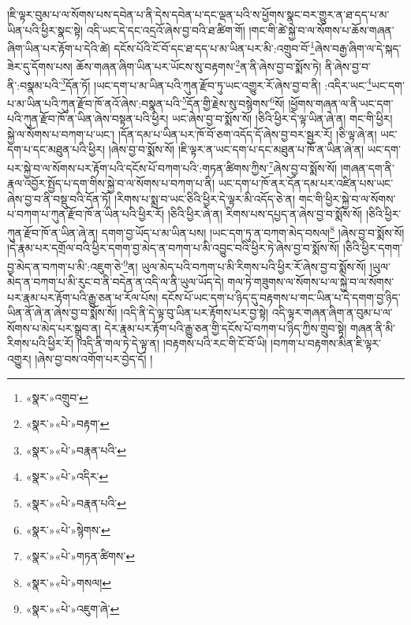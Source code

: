 །ཇི་ལྟར་བུམ་པ་ལ་སོགས་པས་དབེན་པ་ནི་དེས་དབེན་པ་དང་ལྡན་པའི་ས་ཕྱོགས་སྣང་བར་གྱུར་ན་ཐ་དད་པ་མ་ཡིན་པའི་ཕྱིར་སྣང་སྟེ། འདི་ཡང་དེ་དང་འདྲའོ་ཞེས་བྱ་བའི་ཐ་ཚིག་གོ། །གང་གི་ཚེ་སྐྱེ་བ་ལ་སོགས་པ་ཆོས་གཞན་ཞིག་ཡིན་པར་རྟོག་པ་དེའི་ཚེ། དངོས་པོའི་ངོ་བོ་དང་ཐ་དད་པ་མ་ཡིན་པར་མི་:འགྲུབ་བོ་\footnote{«སྣར་»འགྲུབ་}ཞེས་བརྒྱ་ཞིག་ལ་དེ་སྐད་ཟེར་དུ་དོགས་པས། ཆོས་གཞན་ཞིག་ཡིན་པར་ཡོངས་སུ་བརྟགས་\footnote{«སྣར་»«པེ་»བརྟག་}ན་ནི་ཞེས་བྱ་བ་སྨོས་ཏེ། ནི་ཞེས་བྱ་བ་ནི་:བསྣམ་པའི་\footnote{«སྣར་»«པེ་»བརྣན་པའི་}དོན་ཏོ། །ཡང་དག་པ་མ་ཡིན་པའི་ཀུན་རྫོབ་ཏུ་ཡང་འགྱུར་རོ་ཞེས་བྱ་བ་ནི། :འདིར་ཡང་\footnote{«སྣར་»«པེ་»འདིར་}ཡང་དག་པ་མ་ཡིན་པའི་ཀུན་རྫོབ་ཁོ་ནའོ་ཞེས་:བསྣན་པའི་\footnote{«སྣར་»«པེ་»བརྣན་པའི་}དོན་གྱི་རྗེས་སུ་བསྙེགས་\footnote{«སྣར་»«པེ་»སྙེགས་}སོ། །ཕྱོགས་གཞན་ལ་ནི་ཡང་དག་པའི་ཀུན་རྫོབ་ཁོ་ན་ཡིན་ཞེས་བསྟན་པའི་ཕྱིར། ཡང་ཞེས་བྱ་བ་སྨོས་སོ། །ཅིའི་ཕྱིར་དེ་ལྟ་ཡིན་ཞེ་ན། གང་གི་ཕྱིར། སྐྱེ་ལ་སོགས་པ་བཀག་པ་ཡང་། །དོན་དམ་པ་ཡིན་པར་ཁོ་བོ་ཅག་འདོད་དོ་ཞེས་བྱ་བར་སྦྱར་རོ། །ཅི་ལྟ་ཞེ་ན། ཡང་དག་པ་དང་མཐུན་པའི་ཕྱིར། །ཞེས་བྱ་བ་སྨོས་སོ། །ཇི་ལྟར་ན་ཡང་དག་པ་དང་མཐུན་པ་ཁོ་ན་ཡིན་ཞེ་ན། ཡང་དག་པར་སྐྱེ་བ་ལ་སོགས་པར་རྟོག་པའི་དངོས་པོ་བཀག་པའི་:གཏན་ཚིགས་ཀྱིས་\footnote{«སྣར་»«པེ་»གཏན་ཚིགས་}ཞེས་བྱ་བ་སྨོས་སོ། །གཞན་དག་ནི་རྣལ་འབྱོར་སྤྱོད་པ་དག་གིས་སྐྱེ་བ་ལ་སོགས་པ་བཀག་པ་ནི། ཡང་དག་པ་ཁོ་ནར་དོན་དམ་པར་འཛིན་པས་ཡང་ཞེས་བྱ་བ་ནི་བསྡུ་བའི་དོན་ཏོ། །རིགས་པ་སྨྲ་བ་ཡང་ཅིའི་ཕྱིར་དེ་ལྟར་མི་འདོད་ཅེ་ན། གང་གི་ཕྱིར་སྐྱེ་བ་ལ་སོགས་པ་བཀག་པ་ཀུན་རྫོབ་ཁོ་ན་ཡིན་པའི་ཕྱིར་རོ། །ཅིའི་ཕྱིར་ཞེ་ན། རིགས་པས་དཔྱད་ན་ཞེས་བྱ་བ་སྨོས་སོ། །ཅིའི་ཕྱིར་ཀུན་རྫོབ་ཁོ་ན་ཡིན་ཞེ་ན། དགག་བྱ་ཡོད་པ་མ་ཡིན་པས། །ཡང་དག་ཏུ་ན་བཀག་མེད་བསལ།\footnote{«སྣར་»«པེ་»གསལ།} །ཞེས་བྱ་བ་སྨོས་སོ། །དེ་རྣམ་པར་དགྲོལ་བའི་ཕྱིར་དགག་བྱ་མེད་ན་བཀག་པ་མི་འབྱུང་བའི་ཕྱིར་ཏེ་ཞེས་བྱ་བ་སྨོས་སོ། །ཅིའི་ཕྱིར་དགག་བྱ་མེད་ན་བཀག་པ་མི་:འཇུག་ཅེ་\footnote{«སྣར་»«པེ་»འཇུག་ཞེ་}ན། ཡུལ་མེད་པའི་བཀག་པ་མི་རིགས་པའི་ཕྱིར་རོ་ཞེས་བྱ་བ་སྨོས་སོ། །ཡུལ་མེད་ན་བཀག་པ་མི་རུང་བ་ནི་བདེན་ན་འདི་ལ་ནི་ཡུལ་ཡོད་དེ། གལ་ཏེ་གཟུགས་ལ་སོགས་པ་ལ་སྐྱེ་བ་ལ་སོགས་པར་རྣམ་པར་རྟོག་པའི་རྒྱུ་ཅན་ཕ་རོལ་པོས། དངོས་པོ་ཡང་དག་པ་ཉིད་དུ་བརྟགས་པ་གང་ཡིན་པ་དེ་དགག་བྱ་ཉིད་ཡིན་ནོ་ཞེ་ན་ཞེས་བྱ་བ་སྨོས་སོ། །འདི་ནི་དེ་ལྟ་བུ་ཡིན་པར་རྟོགས་པར་བྱ་སྟེ། འདི་ལྟར་གཞན་ཞིག་ན་བུམ་པ་ལ་སོགས་པ་མེད་པར་སྒྲུབ་ན། དེར་རྣམ་པར་རྟོག་པའི་རྒྱུ་ཅན་གྱི་དངོས་པོ་བཀག་པ་ཉིད་ཀྱིས་གྲུབ་སྟེ། གཞན་ནི་མི་རིགས་པའི་ཕྱིར་རོ། །འདི་ནི་གལ་ཏེ་དེ་ལྟ་ན། །བརྟགས་པའི་རང་གི་ངོ་བོ་ཡི། །བཀག་པ་བརྟགས་མིན་ཇི་ལྟར་འགྱུར། །ཞེས་བྱ་བས་འགོག་པར་བྱེད་དོ། །
